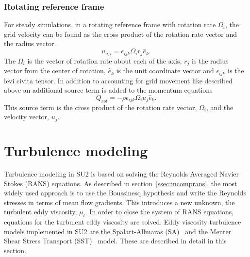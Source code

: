 \subsubsection{Rotating reference frame}
For steady simulations, in a rotating reference frame with rotation rate $\Omega_i$, the grid velocity can be found as the cross product of the rotation rate vector and the radius vector.
\begin{equation}
u_{g,i} = \epsilon_{ijk} \Omega_i r_j\hat{e}_k.
\end{equation} 
The $\Omega_i$ is the vector of rotation rate about each of the axis, $r_j$ is the radius vector from the center of rotation, $\hat{e}_k$ is the unit coordinate vector and $\epsilon_{ijk}$ is the levi civita tensor. In addition to accounting for grid movement like described above an additional source term is added to the momentum equations
\begin{equation}
Q_{rot} = -\rho \epsilon_{ijk} \Omega_i u_j\hat{e}_k.
\end{equation}
This source term is the cross product of the rotation rate vector, $\Omega_i$, and the velocity vector, $u_j$.
\section{Turbulence modeling}
Turbulence modeling in SU2 is based on solving the Reynolds Averaged Navier Stokes (RANS) equations. As described in section~\ref{ssec:incomprans}, the most widely used approach is to use the Boussinesq hypothesis and write the Reynolds stresses in terms of mean flow gradients. This introduces a new unknown, the turbulent eddy viscosity, $\mu_t$. In order to close the system of RANS equations, equations for the turbulent eddy viscosity are solved. Eddy viscosity turbulence models implemented in SU2 are the Spalart-Allmaras (SA)~\cite{spalart1992one} and the Menter Shear Stress Transport (SST)~\cite{menter1994two} model. These are described in detail in this section.

